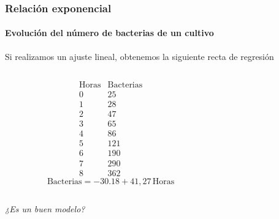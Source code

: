 \begin{frame}
\frametitle{Relación exponencial}
\framesubtitle{Evolución del número de bacterias de un cultivo}
Si realizamos un ajuste lineal, obtenemos la siguiente recta de regresión
\begin{columns}
\begin{column}{0.3\textwidth}
\[
\begin{array}{c|c}
\mbox{Horas} & \mbox{Bacterias}\\
\hline
0 &  25 \\
1 & 28 \\
2 &  47\\
3 & 65 \\
4 & 86\\
5 & 121\\
6 & 190\\
7 & 290\\
8 & 362
\end{array}
\]
\[
\mbox{Bacterias} = -30.18+41,27\,\mbox{Horas}
\]
\end{column}
\begin{column}{0.6\textwidth}
\begin{center}
\end{center}
\end{column}
\end{columns}
\begin{center}
\emph{¿Es un buen modelo?}
\end{center}

\end{frame}


